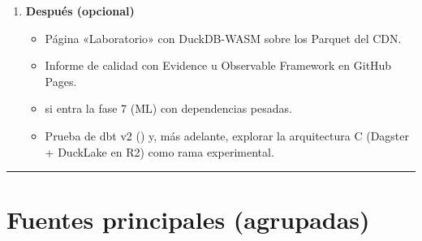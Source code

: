 \begin{enumerate}
\item \textbf{Después (opcional)}
\begin{itemize}
\item Página «Laboratorio» con DuckDB-WASM sobre los Parquet del CDN.
\item Informe de calidad con Evidence u Observable Framework en GitHub Pages.
\item {} si entra la fase 7 (ML) con dependencias pesadas.
\item Prueba de dbt v2 () y, más adelante, explorar la arquitectura C (Dagster + DuckLake en R2) como rama experimental.
\end{itemize}
\end{enumerate}

\medskip\noindent\textcolor{muted!40}{\rule{\linewidth}{0.3pt}}\medskip

\section{Fuentes principales (agrupadas)}

